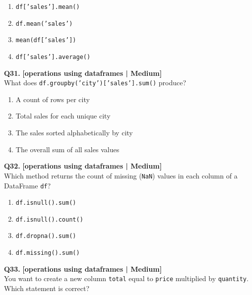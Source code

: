 \begin{enumerate}[label=(\alph*),topsep=2pt,itemsep=1pt,partopsep=0pt,parsep=0pt]
    \item \relax \texttt{df['sales'].mean()}
    \item \relax \texttt{df.mean('sales')}
    \item \relax \texttt{mean(df['sales'])}
    \item \relax \texttt{df['sales'].average()}
\end{enumerate}
\vspace{2mm}

\noindent\textbf{Q31.} \hfill {\small\color{LPUOrange}\textbf{[operations using dataframes | Medium]}}\\[2pt]
What does \texttt{df.groupby('city')['sales'].sum()} produce?

\begin{enumerate}[label=(\alph*),topsep=2pt,itemsep=1pt,partopsep=0pt,parsep=0pt]
    \item \relax A count of rows per city
    \item \relax Total sales for each unique city
    \item \relax The sales sorted alphabetically by city
    \item \relax The overall sum of all sales values
\end{enumerate}
\vspace{2mm}

\noindent\textbf{Q32.} \hfill {\small\color{LPUOrange}\textbf{[operations using dataframes | Medium]}}\\[2pt]
Which method returns the count of missing (\texttt{NaN}) values in each column of a DataFrame \texttt{df}?

\begin{enumerate}[label=(\alph*),topsep=2pt,itemsep=1pt,partopsep=0pt,parsep=0pt]
    \item \relax \texttt{df.isnull().sum()}
    \item \relax \texttt{df.isnull().count()}
    \item \relax \texttt{df.dropna().sum()}
    \item \relax \texttt{df.missing().sum()}
\end{enumerate}
\vspace{2mm}

\noindent\textbf{Q33.} \hfill {\small\color{LPUOrange}\textbf{[operations using dataframes | Medium]}}\\[2pt]
You want to create a new column \texttt{total} equal to \texttt{price} multiplied by \texttt{quantity}. Which statement is correct?

